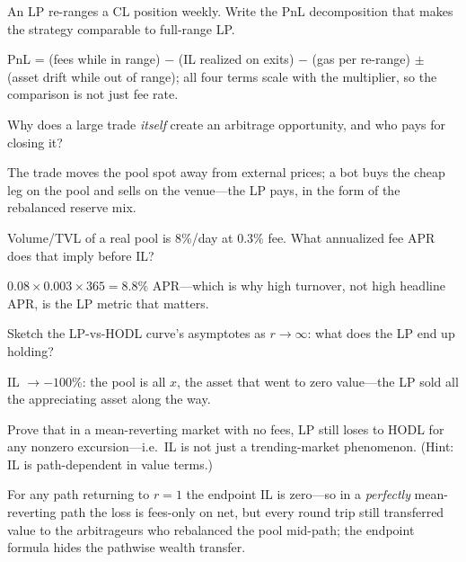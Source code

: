 \begin{exercise}
An LP re-ranges a CL position weekly. Write the PnL decomposition that makes the strategy
comparable to full-range LP.
\end{exercise}
\begin{solution}
PnL = (fees while in range) $-$ (IL realized on exits) $-$ (gas per re-range) $\pm$ (asset
drift while out of range); all four terms scale with the multiplier, so the comparison is
not just fee rate.
\end{solution}

\begin{exercise}
Why does a large trade \emph{itself} create an arbitrage opportunity, and who pays for
closing it?
\end{exercise}
\begin{solution}
The trade moves the pool spot away from external prices; a bot buys the cheap leg on the
pool and sells on the venue---the LP pays, in the form of the rebalanced reserve mix.
\end{solution}

\begin{exercise}
Volume/TVL of a real pool is 8\%/day at 0.3\% fee. What annualized fee APR does that imply
before IL?
\end{exercise}
\begin{solution}
$0.08\times0.003\times365=8.8\%$ APR---which is why high turnover, not high headline APR,
is the LP metric that matters.
\end{solution}

\begin{exercise}
Sketch the LP-vs-HODL curve's asymptotes as $r\to\infty$: what does the LP end up holding?
\end{exercise}
\begin{solution}
IL $\to -100\%$: the pool is all $x$, the asset that went to zero value---the LP sold all
the appreciating asset along the way.
\end{solution}

\begin{exercise}[hard]
Prove that in a mean-reverting market with no fees, LP still loses to HODL for any nonzero
excursion---i.e.\ IL is not just a trending-market phenomenon. (Hint: IL is path-dependent
in value terms.)
\end{exercise}
\begin{solution}
For any path returning to $r=1$ the endpoint IL is zero---so in a \emph{perfectly} mean-
reverting path the loss is fees-only on net, but every round trip still transferred value to
the arbitrageurs who rebalanced the pool mid-path; the endpoint formula hides the
pathwise wealth transfer.
\end{solution}

